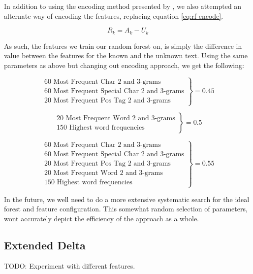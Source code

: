 In addition to using the encoding method presented by \cite{pacheco2015}, we
also attempted an alternate way of encoding the features, replacing equation
\ref{eq:rf-encode}.

$$
R_k = A_k - U_k
$$

As such, the features we train our random forest on, is simply the difference in
value between the features for the known and the unknown text. Using the same
parameters as above but changing out encoding approach, we get the following:

$$
\left.
                \begin{array}{ll}
                  \text{60 Most Frequent Char 2 and 3-grams}\\
                  \text{60 Most Frequent Special Char 2 and 3-grams}\\
                  \text{20 Most Frequent Pos Tag 2 and 3-grams}
                \end{array}
              \right\rbrace = 0.45
$$

$$
\left.
                \begin{array}{ll}
                  \text{20 Most Frequent Word 2 and 3-grams}\\
                  \text{150 Highest word frequencies}
                \end{array}
              \right\rbrace = 0.5
$$

$$
\left.
                \begin{array}{ll}
                  \text{60 Most Frequent Char 2 and 3-grams}\\
                  \text{60 Most Frequent Special Char 2 and 3-grams}\\
                  \text{20 Most Frequent Pos Tag 2 and 3-grams}\\
                  \text{20 Most Frequent Word 2 and 3-grams}\\
                  \text{150 Highest word frequencies}
                \end{array}
              \right\rbrace = 0.55
$$

In the future, we well need to do a more extensive systematic search
for the ideal forest and feature configuration. This somewhat random
selection of parameters, wont accurately depict the efficiency of the
 approach as a whole.

\subsection{Extended Delta}
TODO: Experiment with different features.

